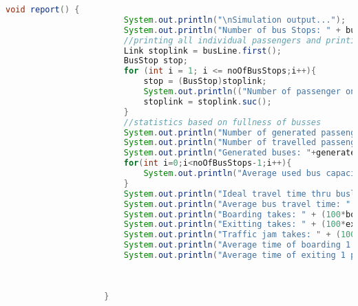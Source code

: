 \documentclass{article}
\begin{document}
\begin{lstlisting}[language=java]
					void report() {
						System.out.println("\nSimulation output...");
						System.out.println("Number of bus Stops: " + busLine.cardinal());
						//printing all individual passengers and printing their entry and exit stop
						Link stoplink = busLine.first();
						BusStop stop;
						for (int i = 1; i <= noOfBusStops;i++){
							stop = (BusStop)stoplink;
							System.out.println(("Number of passenger on "+ i +". bus Stops: " + stop.waitingPassengers.cardinal()));
							stoplink = stoplink.suc();
						}
						//statistics based on fullness of busses
						System.out.println("Number of generated passengers: "+generated_passengers);
						System.out.println("Number of travelled passengers: "+travelled_passengers);
						System.out.println("Generated buses: "+generated_buses);
						for(int i=0;i<noOfBusStops-1;i++){
							System.out.println("Average used bus capacity between "+ (i+1) + ". and " + (i+2)+ ". stop is: "+ 100*avg_used_bus_capacity[i]/(bus_capacity*generated_buses) + " %");
						}
						System.out.println("Ideal travel time thru busline with 1 min for stopping and boarding passengers: "+ ((idealTravelTime+1)*(noOfBusStops-1))+" min");
						System.out.println("Average bus travel time: " + (realTravelTime/generated_buses)+" min");
						System.out.println("Boarding takes: " + (100*boardingTime/realTravelTime) +" %");
						System.out.println("Exitting takes: " + (100*exitTime/realTravelTime)+" %");
						System.out.println("Traffic jam takes: " + (100*(realTravelTime-((idealTravelTime+1)*generated_buses*noOfBusStops))/realTravelTime)+"%");
						System.out.println("Average time of boarding 1 passenger takes "+ (boardingTime/travelled_passengers)+" min");
						System.out.println("Average time of exiting 1 passenger takes "+ (exitTime/travelled_passengers)+" min");
						
						
						
					}
					
					
					

\end{lstlisting}
\end{document}

